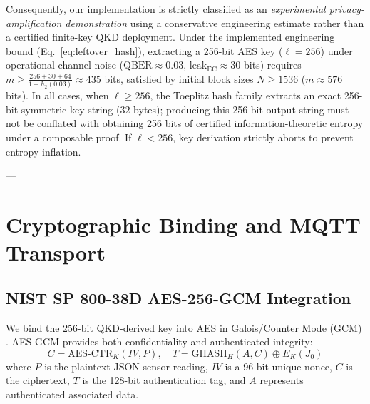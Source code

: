 \documentclass[journal,10pt,twocolumn]{article}
\begin{document}
Consequently, our implementation is strictly classified as an \emph{experimental privacy-amplification demonstration} using a conservative engineering estimate rather than a certified finite-key QKD deployment. Under the implemented engineering bound (Eq.~\ref{eq:leftover_hash}), extracting a 256-bit AES key ($\ell = 256$) under operational channel noise ($\text{QBER} \approx 0.03$, $\text{leak}_{\text{EC}} \approx 30$ bits) requires $m \ge \frac{256 + 30 + 64}{1 - h_2(0.03)} \approx 435$ bits, satisfied by initial block sizes $N \ge 1536$ ($m \approx 576$ bits). In all cases, when $\ell \ge 256$, the Toeplitz hash family extracts an exact 256-bit symmetric key string ($32$ bytes); producing this 256-bit output string must not be conflated with obtaining 256 bits of certified information-theoretic entropy under a composable proof. If $\ell < 256$, key derivation strictly aborts to prevent entropy inflation.

---

\section{Cryptographic Binding and MQTT Transport}

\subsection{NIST SP 800-38D AES-256-GCM Integration}
We bind the 256-bit QKD-derived key into AES in Galois/Counter Mode (GCM) \cite{dworkin2007sp80038d}. AES-GCM provides both confidentiality and authenticated integrity:
\begin{equation}
C = \text{AES-CTR}_K(IV, P), \quad T = \text{GHASH}_H(A, C) \oplus E_K(J_0)
\end{equation}
where $P$ is the plaintext JSON sensor reading, $IV$ is a 96-bit unique nonce, $C$ is the ciphertext, $T$ is the 128-bit authentication tag, and $A$ represents authenticated associated data.
\end{document}
